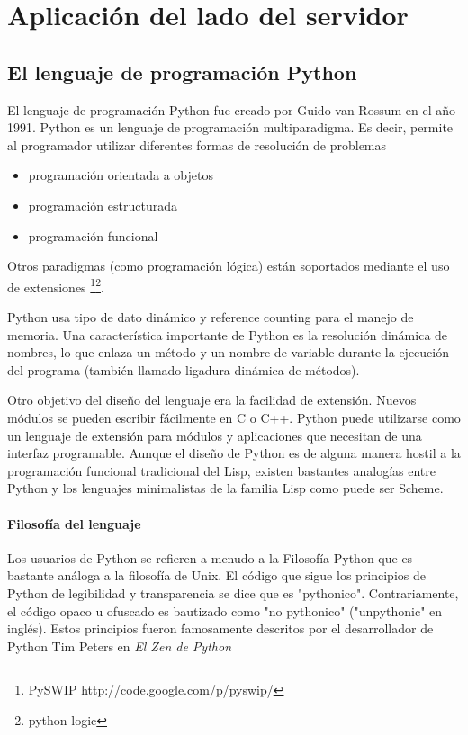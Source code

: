 \documentclass[a4paper]{report}
\begin{document}
\chapter{Aplicación del lado del servidor}

\section{El lenguaje de programación Python}
\label{lang:python}
El lenguaje de programación Python fue creado por Guido van Rossum en el año 1991.
Python es un lenguaje de programación multiparadigma. Es decir, permite al 
programador utilizar diferentes formas de resolución de problemas
\begin{itemize}
 \item {programación orientada a objetos}
 \item {programación estructurada}
 \item {programación funcional}
\end{itemize}
Otros paradigmas (como programación lógica) están soportados mediante el uso de extensiones
\footnote{PySWIP http://code.google.com/p/pyswip/}\footnote{python-logic}.

Python usa tipo de dato dinámico y reference counting para el manejo de memoria. 
Una característica importante de Python es la resolución dinámica de nombres, 
lo que enlaza un método y un nombre de variable durante la ejecución del programa 
(también llamado ligadura dinámica de métodos).

Otro objetivo del diseño del lenguaje era la facilidad de extensión. 
Nuevos módulos se pueden escribir fácilmente en C o C++. 
Python puede utilizarse como un lenguaje de extensión para módulos y 
aplicaciones que necesitan de una interfaz programable. Aunque el diseño de Python es 
de alguna manera hostil a la programación funcional tradicional del Lisp, existen bastantes analogías 
entre Python y los lenguajes minimalistas de la familia Lisp como puede ser Scheme.

\subsubsection*{Filosofía del lenguaje}

Los usuarios de Python se refieren a menudo a la Filosofía Python que es
bastante análoga a la filosofía de Unix. El código que sigue los principios de
Python de legibilidad y transparencia se dice que es "pythonico".
Contrariamente, el código opaco u ofuscado es bautizado como "no pythonico"
("unpythonic" en inglés). Estos principios fueron famosamente descritos por el
desarrollador de Python Tim Peters en \emph{El Zen de Python}
\end{document}
